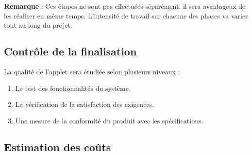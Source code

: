 				\textbf{Remarque} : Ces étapes ne sont pas effectuées séparément, il sera avantageux de les réaliser en même temps. L'intensité de travail sur chacune des phases va varier tout au long du projet.
				

		\subsection{Contrôle de la finalisation}
			La qualité de l'applet sera étudiée selon plusieurs niveaux :
			\begin{enumerate}
			\item Le test des fonctionnalités du système.
			\item La vérification de la satisfaction des exigences.
			\item Une mesure de la conformité du produit avec les spécifications.
			\end{enumerate}
			
		\subsection{Estimation des coûts}
		
